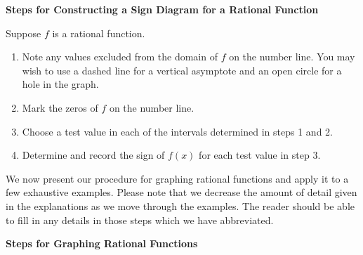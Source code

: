 \documentclass{ximera}
\begin{document}
\label{rationalsigndiagram}


\centerline{\textbf{Steps for Constructing a Sign Diagram for a  Rational Function}} 

\medskip

\hspace{.17in} Suppose $f$ is a rational function. 

\begin{enumerate}


\item  Note any values excluded from the domain of  $f$ on the number line.  You may wish to use a dashed line for a vertical asymptote and an open circle for a hole in the graph.

\item  Mark the zeros of $f$ on the number line.

\item  Choose a test value in each of the intervals determined in steps 1 and 2.

\item  Determine and record the sign of $f(x)$ for each test value in step 3.

\end{enumerate}


\medskip 

We now present our procedure for graphing rational functions and apply it to a few exhaustive examples.  Please note that we decrease the amount of detail given in the explanations as we move through the examples.  The reader should be able to fill in any details in those steps which we have abbreviated.

\medskip


\centerline{\textbf{Steps for Graphing Rational Functions}}

\medskip
\end{document}
